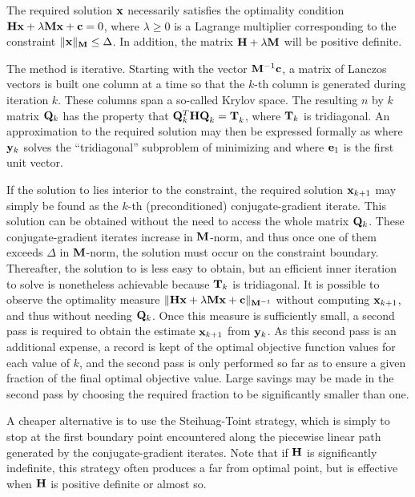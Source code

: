 \documentclass{galahad}
\begin{document}

\galmethod
The required solution ${\mathbf{x}}$ necessarily satisfies the optimality condition
${\mathbf{H}} {\mathbf{x}} + \lambda {\mathbf{M}} {\mathbf{x}} + {\mathbf{c}} = 0$, where $\lambda \geq 0$
is a Lagrange
multiplier corresponding to the constraint $\|{\mathbf{x}}\|_{{\mathbf{M}}}  \leq  \Delta$.
In addition, the matrix ${\mathbf{H}} + \lambda {\mathbf{M}}$ will be positive definite.

\noindent
The method is iterative. Starting  with the vector ${\mathbf{M}}^{-1} {\mathbf{c}}$,
a matrix of Lanczos vectors is built one column at a time
so that the $k$-th column is generated during
iteration $k$. These columns span a so-called Krylov space.
The resulting $n$ by $k$ matrix ${\mathbf{Q}}_k $ has the
property that ${\mathbf{Q}}_{k}^T {\mathbf{H}} {\mathbf{Q}}_k^{}  =  {\mathbf{T}}_{k}^{}$,
where ${\mathbf{T}}_k$ is tridiagonal. An approximation to the
required solution may then be expressed formally as
where ${\mathbf{y}}_k $ solves the ``tridiagonal'' subproblem of minimizing
and where ${\mathbf{e}}_1$ is the first unit vector.

If the solution to  lies interior to the constraint, the required
solution ${\mathbf{x}}_{k+1}$ may simply be found as the $k$-th (preconditioned)
conjugate-gradient iterate. This solution can be obtained without the need to
access the whole matrix ${\mathbf{Q}}_k$.
These conjugate-gradient iterates increase in ${\mathbf{M}}$-norm, and
thus once one of them exceeds $\Delta$ in ${\mathbf{M}}$-norm, the solution must occur
on the constraint boundary. Thereafter, the solution to  is less
easy to obtain, but an efficient inner iteration to solve  is
nonetheless achievable because ${\mathbf{T}}_k $ is tridiagonal.
It is possible to observe the optimality measure
$\|{\mathbf{H}} {\mathbf{x}}  +  \lambda {\mathbf{M}} {\mathbf{x}}  +  {\mathbf{c}}\|_{{\mathbf{M}}^{-1}}$
without computing ${\mathbf{x}}_{k+1}$, and thus without
needing ${\mathbf{Q}}_k $. Once this measure is sufficiently small, a second pass
is required to obtain the estimate ${\mathbf{x}}_{k+1} $ from ${\mathbf{y}}_k $.
As this second pass is an additional expense, a record is kept of the
optimal objective function values for each value of $k$, and the second
pass is only performed so far as to ensure a given fraction of the
final optimal objective value. Large savings may be made in the second
pass by choosing the required fraction to be significantly smaller than one.

A cheaper alternative is to use the Steihuag-Toint strategy, which is simply
to stop at the first boundary point encountered along the piecewise
linear path generated by the conjugate-gradient iterates. Note that if
${\mathbf{H}}$ is significantly indefinite, this strategy often produces a far from
optimal point, but is effective when ${\mathbf{H}}$ is positive definite or almost
so.
\end{document}

